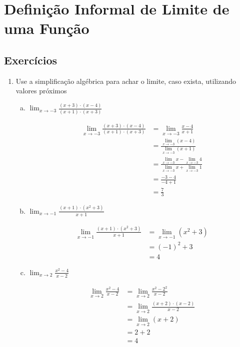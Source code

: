 \documentclass[a4paper, 12pt]{article}
\begin{document}
\section{Definição Informal de Limite de uma
Função}
\subsection{Exercícios}

\begin{enumerate}
    \item Use a simplificação algébrica para achar o limite, caso exista, utilizando valores próximos
    \begin{enumerate}[(a)]

        \item $\lim_{x \to -3} \frac{(x + 3) \cdot (x-4)}{(x+1) \cdot (x+3)}$
        
        \begin{align*}
            \lim_{x \to -3} \frac{(x + 3) \cdot (x-4)}{(x+1) \cdot (x+3)} &= \lim_{x \to -3} \frac{x-4}{x+1} \\
            &= \frac{\lim_{x \to -3}(x-4)}{\lim_{x \to -3} (x+1)} \\
            &= \frac{\lim_{x \to -3}x-\lim_{x \to -3}4}{\lim_{x \to -3} x+\lim_{x \to -3}1} \\
            &= \frac{-3 -4}{-4 + 1} \\
            &= \frac{7}{3}
        \end{align*}

        \item $\lim_{x \to -1} \frac{(x+1) \cdot (x^{2} + 3)}{x+1}$
        
        \begin{align*}
            \lim_{x \to -1} \frac{(x+1) \cdot (x^{2} + 3)}{x+1} &= \lim_{x \to -1}(x^2 + 3) \\
            &= (-1)^2 + 3 \\
            & = 4
        \end{align*}
        
        \item $\lim_{x \to 2} \frac{x^2 - 4}{x - 2}$
        
        \begin{align*}
            \lim_{x \to 2} \frac{x^2 - 4}{x - 2} &= \lim_{x \to 2} \frac{x^2 - 2^2}{x - 2} \\
            &= \lim_{x \to 2} \frac{(x+2) \cdot (x-2)}{x - 2} \\
            &= \lim_{x \to 2}(x+2)\\
            &= 2 + 2 \\
            &= 4
        \end{align*}


\end{enumerate}
\end{enumerate}
\end{document}
